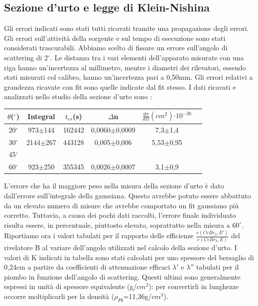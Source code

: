 \documentclass[italian,11pt]{report}
\begin{document}
\subsection{Sezione d'urto e legge di Klein-Nishina}
Gli errori indicati sono stati tutti ricavati tramite una propagazione degli errori. Gli errori sull'attività della sorgente e sul tempo di esecuzione sono stati considerati trascurabili. Abbiamo scelto di fissare un errore sull'angolo di scattering di 2$^\circ$. Le distanza tra i vari elementi dell'apparato misurate con una riga hanno un'incertezza al millimetro, mentre i diametri dei rilevatori, essendo stati misurati col calibro, hanno un'incertezza pari a 0,50mm. Gli errori relativi a grandezza ricavate con fit sono quelle indicate dal fit stesso. 
I dati ricavati e analizzati nello studio della sezione d'urto sono :
\vspace{0,5cm}
\begin{center}
    \centering
    \begin{tabular}{cccccc}
    \hline
    $\theta$($^\circ$)& Integral& $t_{es}$(s)& $\Delta$n&  $\frac{d\sigma}{d\Omega}(cm^{2})$$\cdot$$10^{-26}$\\
    \hline\hline
    20$^\circ$ & 973$\pm$144& 162442& 0,0060$\pm$0,0009&  7,3$\pm$1,4\\
    30$^\circ$& 2144$\pm$267& 443128& 0,005$\pm$0,006&  5,53$\pm$0,95\\
    45$^\circ$& & & & \\
    60$^\circ$& 923$\pm$250& 355345& 0,0026$\pm$0,0007&  3,1$\pm$0,9\\
    \hline
    \end{tabular}
    \end{center}
    \vspace{0,5cm}
L'errore che ha il maggiore peso nella misura della sezione d'urto è dato dall'errore sull'integrale della gaussiana. Questo avrebbe potuto essere abbattuto da un elevato numero di misure che avrebbe comportato un fit gaussiano più corretto. Tuttavia, a causa dei pochi dati raccolti, l'errore finale individuato risulta essere, in percentuale, piuttosto elevato, soprattutto nella misura a $60^\circ$.\newline
Riportiamo ora i valori tabulati per il rapporto delle efficienze $\frac{e(CeBr_{3},E')}{e(CeBr_{3},E)}$ del rivelatore B al variare dell'angolo utilizzati nel calcolo della sezione d'urto. I valori di K indicati in tabella sono stati calcolati per uno spessore del bersaglio di 0,24cm a partire da coefficienti di attenuazione efficaci $\lambda'$ e $\lambda''$ tabulati per il piombo in funzione dell'angolo di scattering. Questi ultimi sono generalmente espressi in unità di spessore equivalente (g/$cm^{2}$): per convertirli in lunghezze occorre moltiplicarli per la densità ($\rho_{Pb}$=11,36g/$cm^{3}$). 
\end{document}
